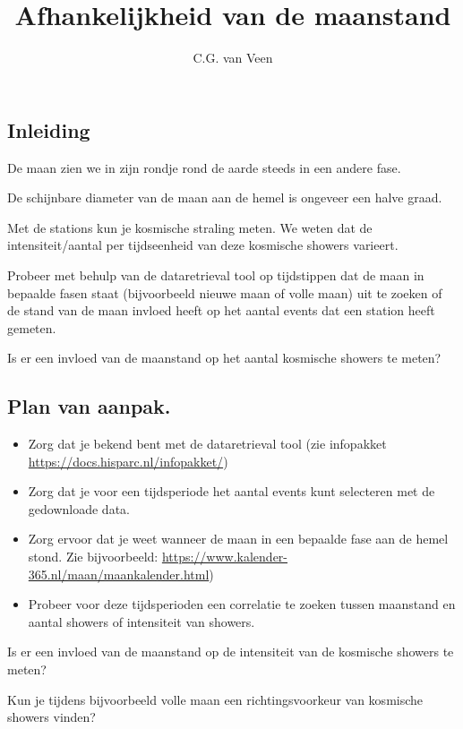 


\title{Afhankelijkheid van de maanstand}
\author{C.G. van Veen}




\maketitle

\begin{questions}

\begin{EnvUplevel}
\section{Inleiding}

De maan zien we in zijn rondje rond de aarde steeds in een andere fase.

De schijnbare diameter van de maan aan de hemel is ongeveer een halve
graad.

Met de \hisparc stations kun je kosmische straling meten. We weten dat de
intensiteit/aantal per tijdseenheid van deze kosmische showers varieert.

Probeer met behulp van de dataretrieval tool op tijdstippen dat de maan in
bepaalde fasen staat (bijvoorbeeld nieuwe maan of volle maan) uit te
zoeken of de stand van de maan invloed heeft op het aantal events dat een
station heeft gemeten.
\end{EnvUplevel}

\question Is er een invloed van de maanstand op het aantal kosmische
showers te meten?

\begin{EnvUplevel}
\section{Plan van aanpak.}

\begin{itemize}
\item Zorg dat je bekend bent met de dataretrieval tool (zie
  infopakket \url{https://docs.hisparc.nl/infopakket/})
\item Zorg dat je voor een tijdsperiode het aantal events kunt
  selecteren met de gedownloade data.
\item Zorg ervoor dat je weet wanneer de maan in een bepaalde fase aan
  de hemel stond. Zie bijvoorbeeld:
  \url{https://www.kalender-365.nl/maan/maankalender.html})
\item Probeer voor deze tijdsperioden een correlatie te zoeken tussen
  maanstand en aantal showers of intensiteit van showers.
\end{itemize}
\end{EnvUplevel}



\question Is er een invloed van de maanstand op de intensiteit van de
kosmische showers te meten?

\question Kun je tijdens bijvoorbeeld volle maan een richtingsvoorkeur van
kosmische showers vinden?


\end{questions}

